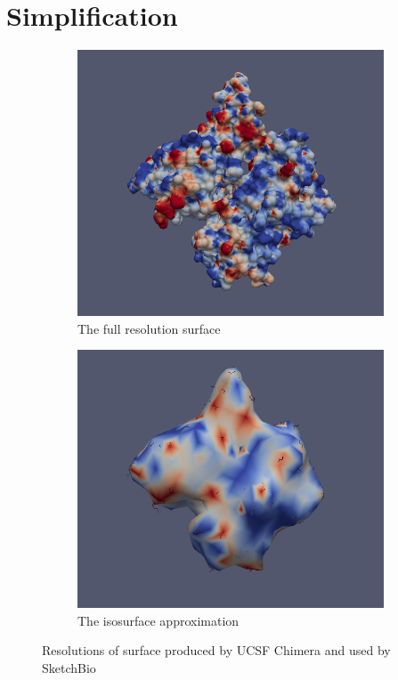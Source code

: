 \documentclass{article} %
\begin{document}
\section{Simplification}

\begin{figure}[h]
	\centering
	\begin{subfigure}[b]{0.4\textwidth}
		\includegraphics[width=\textwidth]{fullResolution.png}
		\caption{The full resolution surface}
		\label{fig:fullResolution}
	\end{subfigure}
	\begin{subfigure}[b]{0.4\textwidth}
		\includegraphics[width=\textwidth]{isosurface.png}
		\caption{The isosurface approximation}
		\label{fig:isosurface}
	\end{subfigure}
	\caption{Resolutions of surface produced by UCSF Chimera and used by SketchBio}
	\label{fig:resolutions}
\end{figure}
\end{document}
